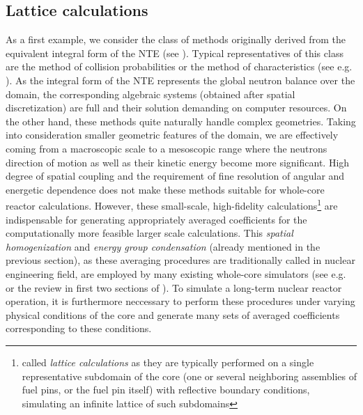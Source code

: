 \subsection{Lattice calculations} \label{sec:lattice}
As a first example, we consider the class of
methods originally derived from the equivalent integral form of the NTE (see ). Typical
representatives of this class are the method of collision probabilities or the method of characteristics (see e.g.
\cite{Cho2,Wu1,Hursin1,Petkov1,Sanchez1}). As the integral form of the NTE represents the global neutron balance over
the domain, the corresponding algebraic systems (obtained after spatial discretization) are full and
their solution demanding on computer resources. On the other hand, these methods quite naturally handle complex
geometries. Taking into consideration smaller geometric features of the domain, we are effectively coming from a
macroscopic scale to a mesoscopic range where the neutrons direction of motion as well as their kinetic energy become
more significant. High degree of spatial coupling and the requirement of fine resolution of angular and energetic
dependence does not make these methods suitable for whole-core reactor calculations.
However, these small-scale,
high-fidelity calculations\footnote{called \textit{lattice calculations} as they are typically performed on a single
representative subdomain of the core (one or several neighboring assemblies of fuel pins, or the fuel pin itself)
with reflective boundary conditions, simulating an infinite lattice of such subdomains} are indispensable for
generating appropriately averaged coefficients for the computationally more feasible larger scale calculations.
This \textit{spatial homogenization} and \textit{energy group condensation} (already mentioned in the previous
section), as these averaging procedures are traditionally called in nuclear engineering field, are employed by many existing whole-core simulators (see e.g.
\cite[Chap. 17]{Reuss1} or the review in first two sections of \cite{Sanchez7}). To simulate a long-term nuclear reactor
operation, it is furthermore neccessary to perform these procedures under varying physical conditions of the core and
generate many sets of averaged coefficients corresponding to these conditions.

